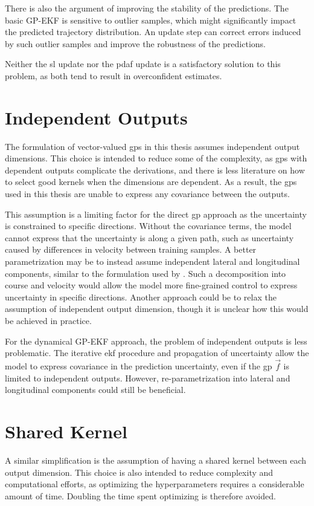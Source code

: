 There is also the argument of improving the stability of the predictions. The basic GP-EKF is sensitive to outlier samples, which might significantly impact the predicted trajectory distribution. An update step can correct errors induced by such outlier samples and improve the robustness of the predictions. 

Neither the \acrshort{sl} update nor the \acrshort{pdaf} update is a satisfactory solution to this problem, as both tend to result in overconfident estimates.  



\section{Independent Outputs}
The formulation of vector-valued \acrshort{gp}s in this thesis assumes independent output dimensions. This choice is intended to reduce some of the complexity, as \acrshort{gp}s with dependent outputs complicate the derivations, and there is less literature on how to select good kernels when the dimensions are dependent. As a result, the \acrshort{gp}s used in this thesis are unable to express any covariance between the outputs. 

This assumption is a limiting factor for the direct \acrshort{gp} approach as the uncertainty is constrained to specific directions. Without the covariance terms, the model cannot express that the uncertainty is along a given path, such as uncertainty caused by differences in velocity between training samples. A better parametrization may be to instead assume independent lateral and longitudinal components, similar to the formulation used by \cite{gp_ais_trajectory}. Such a decomposition into course and velocity would allow the model more fine-grained control to express uncertainty in specific directions. Another approach could be to relax the assumption of independent output dimension, though it is unclear how this would be achieved in practice. 

For the dynamical GP-EKF approach, the problem of independent outputs is less problematic. The iterative \acrshort{ekf} procedure and propagation of uncertainty allow the model to express covariance in the prediction uncertainty, even if the \acrshort{gp} $\vec{f}$ is limited to independent outputs. However, re-parametrization into lateral and longitudinal components could still be beneficial.

\section{Shared Kernel}
A similar simplification is the assumption of having a shared kernel between each output dimension. This choice is also intended to reduce complexity and computational efforts, as optimizing the hyperparameters requires a considerable amount of time. Doubling the time spent optimizing is therefore avoided. 

